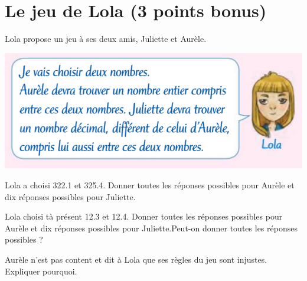 \section{Le jeu de Lola (3 points bonus)}

Lola propose un jeu à ses deux amis, Juliette et Aurèle.

\begin{center}
	\includegraphics[scale=0.6]{img/lola}
\end{center}

\begin{questions}
	\question[1] Lola a choisi  \num{322.1} et \num{325.4}. Donner toutes les réponses possibles pour Aurèle et dix réponses possibles pour Juliette.
	
	\question[1] Lola choisi tà présent \num{12.3} et \num{12.4}. Donner toutes les réponses possibles pour Aurèle et dix réponses possibles pour Juliette.Peut-on donner toutes les réponses possibles ?
	
	
\question[1] Aurèle n'est pas content et dit à Lola que ses règles du jeu sont injustes. Expliquer pourquoi.
\end{questions}